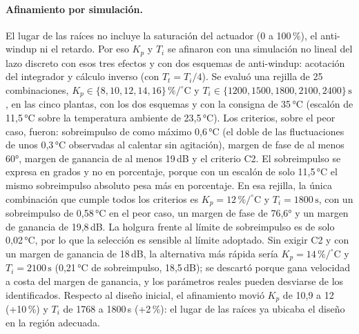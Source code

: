 \paragraph{Afinamiento por simulación.} El lugar de las raíces no incluye la saturación del actuador (0 a 100\,\%), el anti-windup ni el retardo. Por eso $K_p$ y $T_i$ se afinaron con una simulación no lineal del lazo discreto con esos tres efectos y con dos esquemas de anti-windup: acotación del integrador y cálculo inverso (con $T_t = T_i/4$). Se evaluó una rejilla de 25 combinaciones, $K_p \in \{8, 10, 12, 14, 16\}\,\%/^{\circ}\mathrm{C}$ y $T_i \in \{1200, 1500, 1800, 2100, 2400\}\,\mathrm{s}$, en las cinco plantas, con los dos esquemas y con la consigna de 35\,°C (escalón de 11,5\,°C sobre la temperatura ambiente de 23,5\,°C). Los criterios, sobre el peor caso, fueron: sobreimpulso de como máximo 0,6\,°C (el doble de las fluctuaciones de unos 0,3\,°C observadas al calentar sin agitación), margen de fase de al menos 60°, margen de ganancia de al menos 19\,dB y el criterio C2. El sobreimpulso se expresa en grados y no en porcentaje, porque con un escalón de solo 11,5\,°C el mismo sobreimpulso absoluto pesa más en porcentaje. En esa rejilla, la única combinación que cumple todos los criterios es $K_p = 12\,\%/^{\circ}\mathrm{C}$ y $T_i = 1800\,\mathrm{s}$, con un sobreimpulso de 0,58\,°C en el peor caso, un margen de fase de 76,6° y un margen de ganancia de 19,8\,dB. La holgura frente al límite de sobreimpulso es de solo 0,02\,°C, por lo que la selección es sensible al límite adoptado. Sin exigir C2 y con un margen de ganancia de 18\,dB, la alternativa más rápida sería $K_p = 14\,\%/^{\circ}\mathrm{C}$ y $T_i = 2100\,\mathrm{s}$ (0,21\,°C de sobreimpulso, 18,5\,dB); se descartó porque gana velocidad a costa del margen de ganancia, y los parámetros reales pueden desviarse de los identificados. Respecto al diseño inicial, el afinamiento movió $K_p$ de 10,9 a 12 (+10\,\%) y $T_i$ de 1768 a 1800\,s (+2\,\%): el lugar de las raíces ya ubicaba el diseño en la región adecuada.


